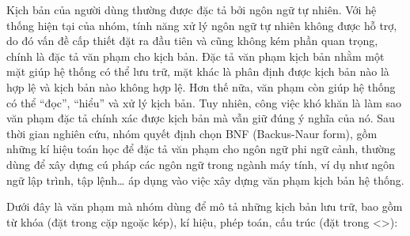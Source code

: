 \documentclass[12pt,a4paper,oneside]{extbook}
\begin{document}
Kịch bản của người dùng thường được đặc tả bởi ngôn ngữ tự nhiên. Với hệ thống hiện tại của nhóm, tính năng xử lý ngôn ngữ tự nhiên không được hỗ trợ, do đó vấn đề cấp thiết đặt ra đầu tiên và cũng không kém phần quan trọng, chính là đặc tả văn phạm cho kịch bản. Đặc tả văn phạm kịch bản nhằm một mặt giúp hệ thống có thể lưu trữ, mặt khác là phân định được kịch bản nào là hợp lệ và kịch bản nào không hợp lệ. Hơn thế nữa, văn phạm còn giúp hệ thống có thể “đọc”, “hiểu” và xử lý kịch bản. Tuy nhiên, công việc khó khăn là làm sao văn phạm đặc tả chính xác được kịch bản mà vẫn giữ đúng ý nghĩa của nó. Sau thời gian nghiên cứu, nhóm quyết định chọn BNF (Backus-Naur form), gồm những kí hiệu toán học để đặc tả văn phạm cho ngôn ngữ phi ngữ cảnh, thường dùng để xây dựng cú pháp các ngôn ngữ trong ngành máy tính, ví dụ như ngôn ngữ lập trình, tập lệnh\dots\hspace{0mm} áp dụng vào việc xây dựng văn phạm kịch bản hệ thống.

Dưới đây là văn phạm mà nhóm dùng để mô tả những kịch bản lưu trữ, bao gồm từ khóa (đặt trong cặp ngoặc kép), kí hiệu, phép toán, cấu trúc (đặt trong <>):
\end{document}
